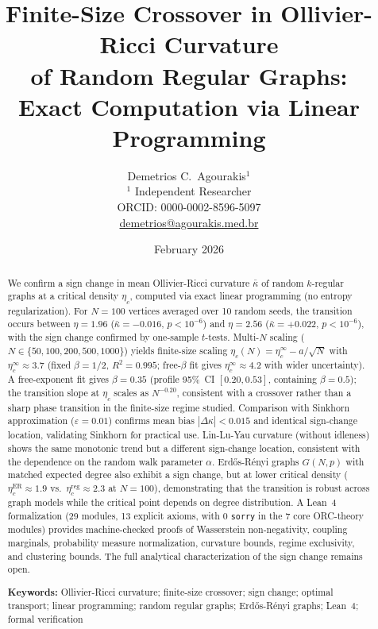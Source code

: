 \documentclass[12pt]{article}
\newcommand{\kbar}{\bar{\kappa}}
\newcommand{\etac}{\eta_c}
\newcommand{\sorry}{\texttt{sorry}}
\begin{document}
\title{\textbf{Finite-Size Crossover in Ollivier-Ricci Curvature\\
of Random Regular Graphs:\\
Exact Computation via Linear Programming}}

\author{Demetrios C.\ Agourakis$^{1}$\\[4pt]
\small $^1$ Independent Researcher\\
\small ORCID: 0000-0002-8596-5097\\
\small \href{mailto:demetrios@agourakis.med.br}{demetrios@agourakis.med.br}}

\date{February 2026}

\maketitle
\thispagestyle{empty}

\begin{abstract}
We confirm a sign change in mean Ollivier-Ricci curvature $\kbar$ of random $k$-regular graphs
at a critical density $\etac$, computed via exact linear programming (no entropy regularization).
For $N = 100$ vertices averaged over 10 random seeds, the transition occurs between
$\eta = 1.96$ ($\kbar = -0.016$, $p < 10^{-6}$) and $\eta = 2.56$ ($\kbar = +0.022$,
$p < 10^{-6}$), with the sign change confirmed by one-sample $t$-tests.
Multi-$N$ scaling ($N \in \{50, 100, 200, 500, 1000\}$) yields finite-size scaling
$\etac(N) = \etac^\infty - a/\sqrt{N}$ with $\etac^\infty \approx 3.7$ (fixed $\beta = 1/2$,
$R^2 = 0.995$; free-$\beta$ fit gives $\etac^\infty \approx 4.2$ with wider uncertainty).
A free-exponent fit gives $\beta = 0.35$ (profile 95\%~CI $[0.20, 0.53]$, containing
$\beta = 0.5$); the transition slope at $\etac$ scales as $N^{-0.20}$, consistent with a
crossover rather than a sharp phase transition in the finite-size regime studied.
Comparison with Sinkhorn approximation ($\varepsilon = 0.01$) confirms mean bias
$|\Delta\kappa| < 0.015$ and identical sign-change location, validating Sinkhorn for practical
use. Lin-Lu-Yau curvature (without idleness) shows the same monotonic trend but a different
sign-change location, consistent with the dependence on the random walk parameter $\alpha$.
Erd\H{o}s-R\'{e}nyi graphs $G(N,p)$ with matched expected degree also exhibit a sign change,
but at lower critical density ($\etac^{\mathrm{ER}} \approx 1.9$ vs.\ $\etac^{\mathrm{reg}}
\approx 2.3$ at $N = 100$), demonstrating that the transition is robust across graph models
while the critical point depends on degree distribution.
A Lean~4 formalization (29 modules, 13 explicit axioms, with 0 \sorry{} in the 7 core
ORC-theory modules) provides machine-checked proofs of Wasserstein non-negativity, coupling
marginals, probability measure normalization, curvature bounds, regime exclusivity, and
clustering bounds. The full analytical characterization of the sign change remains open.

\medskip\noindent
\textbf{Keywords:} Ollivier-Ricci curvature; finite-size crossover; sign change; optimal transport;
linear programming; random regular graphs; Erd\H{o}s-R\'{e}nyi graphs; Lean~4; formal verification
\end{abstract}
\end{document}
